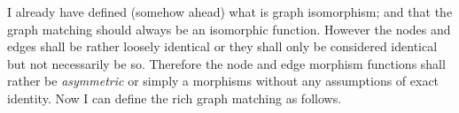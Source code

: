 
%




I already have defined (somehow ahead) what is graph isomorphism; and that the graph matching should always be an isomorphic function. However the nodes and edges shall be rather loosely identical or they shall only be considered identical but not necessarily be so. Therefore the node and edge morphism functions shall rather be \textit{asymmetric} or simply a morphisms without any assumptions of exact identity. Now I can define the rich graph matching as follows.  



